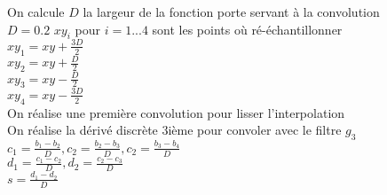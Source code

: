   \begin{algorithm}
 \caption{$eval4Integral(img,Img,xy)$}
 \end{algorithm}
 
 \begin{algorithm}
 \caption{$convolImg(img,Img,xy,d)$}
 On calcule $D$ la largeur de la fonction porte servant à la convolution\\
 {
 $D=0.2$
 }
 $xy_{i}$ pour $ i=1...4$ sont les points où ré-échantillonner\\
 $xy_{1}  = xy + \frac{3D}{2}$\\
 $xy_{2}  = xy + \frac{D}{2}$\\
 $xy_{3}  = xy - \frac{D}{2}$\\
 $xy_{4}  = xy - \frac{3D}{2}$\\
 On réalise une première convolution pour lisser l'interpolation\\
 On réalise la dérivé discrète $3$ième pour convoler avec le filtre $g_3$\\
 $c_1 = \frac{b_1 - b_2}{D},c_2=\frac{b_2 - b_3}{D},c_2=\frac{b_3 - b_4}{D}$\\
 $d_1 = \frac{c_1 - c_2}{D},d_2=\frac{c_2 - c_3}{D}$\\
 $s = \frac{d_1 - d_2}{D}$\\
 \end{algorithm}
